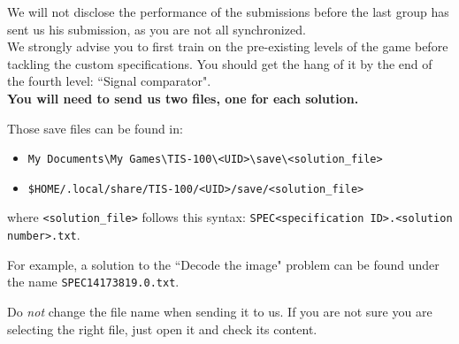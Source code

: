 \documentclass[10pt,a4paper]{article}
\theoremstyle{definition}%
\newtheorem{Q}{Question}[] %
\begin{document}
We will not disclose the performance of the submissions before the last group has sent us his submission, as you are not all synchronized.
~\\

We strongly advise you to first train on the pre-existing levels of the game before tackling the custom specifications.
You should get the hang of it by the end of the fourth level: ``Signal comparator".
~\\

\textbf{You will need to send us two  files, one for each solution.}

Those save files can be found in:
\begin{itemize}
	\item[\faWindows] \verb|My Documents\My Games\TIS-100\<UID>\save\<solution_file>|
	\item[\faLinux] \verb|$HOME/.local/share/TIS-100/<UID>/save/<solution_file>|
\end{itemize}
where \texttt{<solution\_file>} follows this syntax: \texttt{SPEC<specification ID>.<solution number>.txt}.

For example, a solution to the ``Decode the image" problem can be found under the name \texttt{SPEC14173819.0.txt}.

Do \textit{not} change the file name when sending it to us.
If you are not sure you are selecting the right file, just open it and check its content.

\end{document}
